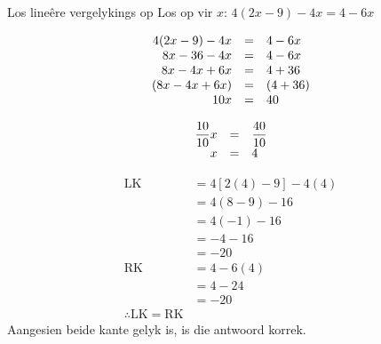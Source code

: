 \begin{wex}{Los line\^ere vergelykings op }
{Los op vir $x$: $4(2x-9)-4x=4-6x$}
{

\begin{equation*}
    \begin{array}{ccl}\hfill 4(2x-9)-4x& =& 4-6x\hfill  \\ 
	\hfill 8x-36-4x& =& 4-6x\hfill   \\ 
	\hfill 8x-4x+6x& =& 4+36\hfill  \\ 
	\hfill (8x-4x+6x)& =& (4+36)\hfill   \\   
	\hfill 10x& =& 40\hfill  
    \end{array}
\end{equation*}

\begin{equation*}
    \begin{array}{ccl}
	\hfill \dfrac{10}{10}x& =& \dfrac{40}{10}\hfill\\
	\hfill x& =& 4\hfill  
    \end{array}
\end{equation*}


\begin{equation*}
    \begin{array}{ccl}
  \mbox{LK} &= 4\left[2(4)-9\right]-4(4)\\
  &=4(8-9)-16\\
  &=4(-1)-16\\
  &=-4-16\\
  &=-20\\

\mbox{RK} &= 4-6(4) \\
  &= 4-24 \\
  &= -20 \\
\therefore \mbox{LK} = \mbox{RK}
    \end{array}
\end{equation*}
Aangesien beide kante gelyk is, is die antwoord korrek.
}
\end{wex}

